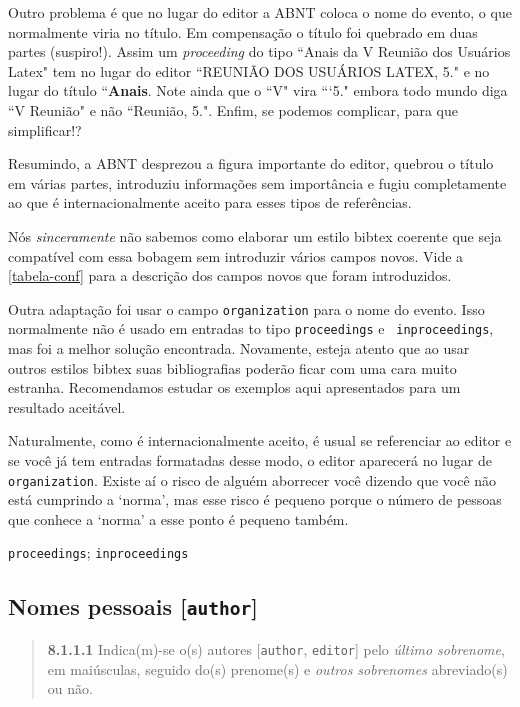 \documentclass[a4paper]{ltxdoc}
\begin{document}
Outro problema é que no lugar do editor a ABNT coloca o nome do evento, o que
normalmente viria no título. Em compensação o título foi quebrado em duas partes
(suspiro!). Assim um \textit{proceeding} do tipo ``Anais da V Reunião dos
Usuários Latex" tem no lugar do editor ``REUNIÃO DOS USUÁRIOS LATEX, 5." e no lugar
do título ``{\bf Anais}. Note ainda que o ``V" vira ```5." embora
todo mundo diga ``V Reunião" e não ``Reunião, 5.". Enfim, se podemos complicar,
para que simplificar!?

Resumindo, a ABNT desprezou a figura importante do editor, quebrou o título
em várias partes, introduziu informações sem importância e fugiu completamente
ao que é internacionalmente aceito para esses tipos de referências.

Nós \emph{sinceramente} não sabemos como elaborar um estilo \textsf{bibtex}
coerente que seja compatível com essa bobagem sem introduzir vários campos novos.
Vide a \autoref{tabela-conf} para a descrição dos campos novos que foram
introduzidos.

Outra adaptação foi usar o campo {\tt organization} para o nome do evento. Isso
normalmente não é usado em entradas to tipo {\tt proceedings} e {\tt
inproceedings}, mas foi a melhor solução encontrada. Novamente, esteja atento
que ao usar outros estilos \textsf{bibtex} suas bibliografias poderão ficar com
uma cara muito estranha. Recomendamos estudar os exemplos aqui apresentados para
um resultado aceitável.

Naturalmente, como é internacionalmente aceito, é usual se referenciar ao
editor e se você já tem entradas formatadas desse modo, o editor aparecerá
no lugar de {\tt organization}. Existe aí o risco de alguém aborrecer você
dizendo que você não está cumprindo a `norma', mas esse risco é pequeno
porque o número de pessoas que conhece a `norma' a esse ponto é
pequeno também.

{\tt proceedings}\cite{7.5.1.2-1,7.5.1.2-2,7.5.1.2-3,7.5.3-1,8.1.2.1-3};
{\tt inproceedings}\cite{7.5.2.2-1,7.5.2.2-2,7.5.2.2-3,7.5.3-2,7.5.3-3,7.5.3-4,7.5.3-5}

\subsection{Nomes pessoais [{\tt author}]}

\label{nome-pessoais}
\begin{quote}
{\bf 8.1.1.1}\cite{NBR6023:2000}
Indica(m)-se o(s) autores [{\tt author}, {\tt editor}]
pelo \emph{último sobrenome}, em maiúsculas, seguido
do(s) prenome(s) e \emph{outros sobrenomes} abreviado(s) ou não.
\cite{8.1.1.1-1,8.1.1.1-2}
\cite{8.1.1.1-1,8.1.1.1-2,8.1.1.1-3}
\end{quote}
\end{document}
